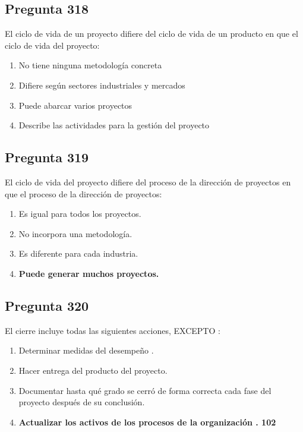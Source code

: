 \documentclass[11pt,a4paper]{article}
\begin{document}
\subsection*{Pregunta 318}
El ciclo de vida de un proyecto difiere del ciclo de vida de un producto en que el ciclo de vida del proyecto:

\begin{enumerate}[label=\alph*)]
  \item No tiene ninguna metodología concreta
  \item Difiere según sectores industriales y mercados
  \item Puede abarcar varios proyectos
  \item Describe las actividades para la gestión del proyecto
\end{enumerate}

\subsection*{Pregunta 319}
El ciclo de vida del proyecto difiere del proceso de la dirección de proyectos en que el proceso de la dirección de proyectos:

\begin{enumerate}[label=\alph*)]
  \item Es igual para todos los proyectos.
  \item No incorpora una metodología.
  \item Es diferente para cada industria.
  \item \textbf{Puede generar muchos proyectos.}
\end{enumerate}

\subsection*{Pregunta 320}
El cierre incluye todas las siguientes acciones, EXCEPTO :

\begin{enumerate}[label=\alph*)]
  \item Determinar medidas del desempeño .
  \item Hacer entrega del producto del proyecto.
  \item Documentar hasta qué grado se cerró de forma correcta cada fase del proyecto después de su conclusión.
  \item \textbf{Actualizar los activos de los procesos de la organización . 102}
\end{enumerate}
\end{document}
